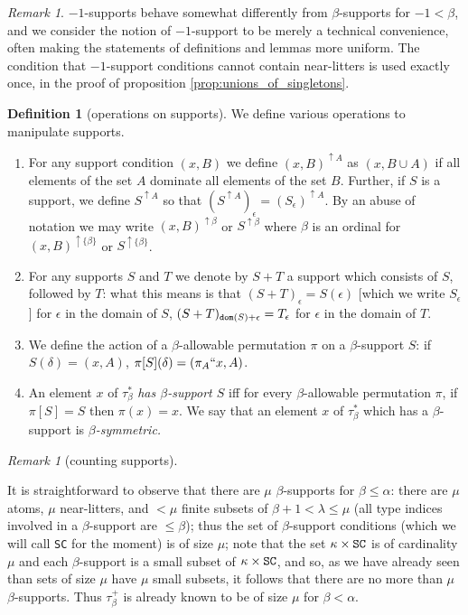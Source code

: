 \documentclass[112pt]{article}
\theoremstyle{definition}
\newtheorem{definition}[theorem]{Definition}
\theoremstyle{remark}
\newtheorem{remark}[theorem]{Remark}
\begin{document}
{
\begin{remark}
 $-1$-supports behave somewhat differently from $\beta$-supports for $-1 < \beta$, and we consider the notion of $-1$-support to be merely a technical convenience, often making the statements of definitions and lemmas more uniform.
  The condition that $-1$-support conditions cannot contain near-litters is used exactly once, in the proof of proposition \ref{prop:unions_of_singletons}.
\end{remark}
}



\begin{definition}[operations on supports]\label{def:support_operations}
{We define various operations to manipulate supports.}
\begin{enumerate}
\item For any support condition $(x,B)$ we define $(x,B)^{\uparrow A}$ as $(x,B\cup A)$ if all elements of the set $A$ dominate all elements of the set $B$.
Further, if $S$ is a support, we define $S^{\uparrow A}$ so that $(S^{\uparrow A})_\epsilon = (S_\epsilon)^{\uparrow A}$.  By an abuse of notation we may write $(x,B)^{\uparrow \beta}$ or $S^{\uparrow \beta}$ where $\beta$ is an ordinal for $(x,B)^{\uparrow \{\beta\}}$ or $S^{\uparrow \{\beta\}}$.

\item For any supports $S$ and $T$ we denote by $S+T$ a support which consists
of $S$, followed by $T$:  what this means is that $(S+T)_\epsilon = S(\epsilon)$ [which we write $S_\epsilon$] for $\epsilon$ in the domain of $S$, $(S+T)_{{\tt dom}(S)+\epsilon} = T_\epsilon$ for $\epsilon$ in the domain of $T$.

\item We define the action of a $\beta$-allowable permutation $\pi$ on a $\beta$-support $S$:  if $S(\delta) = (x,A)$, $\pi[S](\delta) = (\pi_A``x,A)$.
\item
An element $x$ of $\tau^*_\beta$ {\em has $\beta$-support $S$\/} iff for every $\beta$-allowable permutation $\pi$, if $\pi[S] = S$ then $\pi(x)=x$.  We say that  an element $x$ of $\tau^*_\beta$ which has a $\beta$-support is {\em $\beta$-symmetric.}
\end{enumerate}
\end{definition}

\begin{remark}[counting supports]\label{rk:counting_supports}

It is straightforward to observe that there are $\mu$ $\beta$-supports for $\beta\leq \alpha$:  there are $\mu$ atoms, $\mu$ near-litters, and
$<\mu$ finite subsets of $\beta +1<\lambda \leq \mu$ (all type indices involved in a $\beta$-support are $\leq \beta$);  thus the set of $\beta$-support conditions (which we will call {\tt SC} for the moment) is of size $\mu$;
note that the set $\kappa \times {\tt SC}$ is of cardinality $\mu$ and each $\beta$-support is a small subset of  $\kappa \times {\tt SC}$, and so, as we have already seen than sets of size $\mu$ have $\mu$ small subsets, it follows that there are no more than $\mu$ $\beta$-supports.
Thus $\tau_\beta^+$ is already known to be of size $\mu$ for $\beta<\alpha$.

\end{remark}
\end{document}
